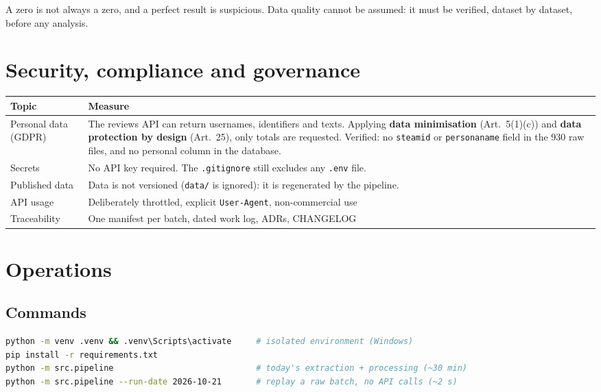 \documentclass[11pt, a4paper, oneside, headings=normal, numbers=noenddot, DIV=12]{scrartcl}
\begin{document}
\begin{keybox}[Lesson]
A zero is not always a zero, and a perfect result is suspicious. Data quality cannot be assumed: it must be verified,
dataset by dataset, before any analysis.
\end{keybox}

\section{Security, compliance and governance}

\begin{tabularx}{\linewidth}{@{}L{3.6cm} Y@{}}
\toprule
\textbf{Topic} & \textbf{Measure} \\
\midrule
Personal data (GDPR) & The reviews API can return usernames, identifiers and texts. Applying \textbf{data minimisation} (Art.~5(1)(c))
and \textbf{data protection by design} (Art.~25), only totals are requested. Verified: no \texttt{steamid} or \texttt{personaname}
field in the 930 raw files, and no personal column in the database. \\
Secrets & No API key required. The \texttt{.gitignore} still excludes any \texttt{.env} file. \\
Published data & Data is not versioned (\texttt{data/} is ignored): it is regenerated by the pipeline. \\
API usage & Deliberately throttled, explicit \texttt{User-Agent}, non-commercial use \\
Traceability & One manifest per batch, dated work log, ADRs, CHANGELOG \\
\bottomrule
\end{tabularx}

\section{Operations}

\subsection{Commands}
\begin{lstlisting}[language=bash]
python -m venv .venv && .venv\Scripts\activate     # isolated environment (Windows)
pip install -r requirements.txt
python -m src.pipeline                             # today's extraction + processing (~30 min)
python -m src.pipeline --run-date 2026-10-21       # replay a raw batch, no API calls (~2 s)
\end{lstlisting}
\end{document}
